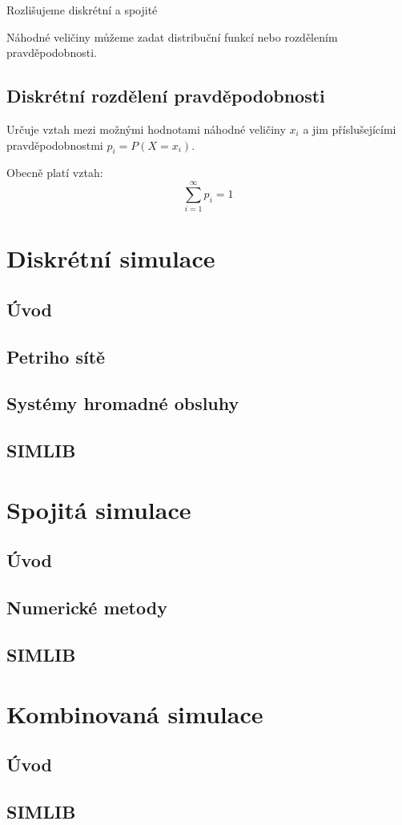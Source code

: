 \documentclass[11pt]{article}
\begin{document}
Rozlišujeme diskrétní a spojité

Náhodné veličiny můžeme zadat distribuční funkcí nebo rozdělením
pravděpodobnosti.

\subsection{Diskrétní rozdělení pravděpodobnosti}
\label{sec:orgcc202f7}
Určuje vztah mezi možnými hodnotami náhodné veličiny \(x_i\) a jim příslušejícími
pravděpodobnostmi \(p_i = P(X = x_i)\).

Obecně platí vztah:
\begin{equation}
    \sum_{i=1}^\infty p_i = 1
\end{equation}

\section{Diskrétní simulace}
\label{sec:orgf4f0dc8}
\subsection{Úvod}
\label{sec:orgbecf5a4}
\subsection{Petriho sítě}
\label{sec:orge545f6e}
\subsection{Systémy hromadné obsluhy}
\label{sec:orgc31d431}
\subsection{SIMLIB}
\label{sec:orgb0fc8d5}

\section{Spojitá simulace}
\label{sec:org22d01e9}
\subsection{Úvod}
\label{sec:orgbc7abbf}
\subsection{Numerické metody}
\label{sec:org037f883}
\subsection{SIMLIB}
\label{sec:org6897213}

\section{Kombinovaná simulace}
\label{sec:orga689c73}
\subsection{Úvod}
\label{sec:org6d4c4aa}
\subsection{SIMLIB}
\label{sec:org2ddd9d8}
\end{document}
